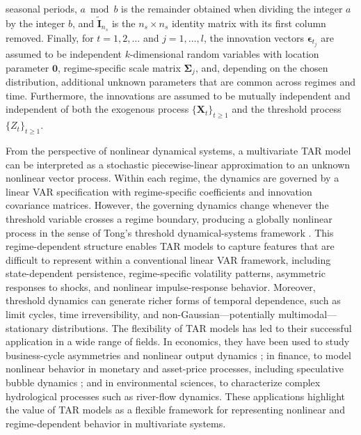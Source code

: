 seasonal periods, $a \bmod b$ is the remainder obtained when dividing the integer $a$ by the integer $b$, and $\tilde{\bm{I}}_{n_s}$ is the $n_s \times n_s$ identity matrix with its first column removed. Finally, for $t=1,2,\ldots$ and $j=1,\ldots,l$, the innovation vectors $\bm{\epsilon}_{t_j}$ are assumed to
be independent $k$-dimensional random variables with location parameter $\bm{0}$, regime-specific scale matrix $\bm{\Sigma}_j$, and, depending on the chosen distribution, additional unknown parameters that are common across regimes and time. Furthermore, the innovations are assumed to be mutually independent and independent of both the exogenous process $\{\bm{X}_t\}_{t\geq 1}$ and the threshold process $\{Z_t\}_{t\geq 1}$. 

From the perspective of nonlinear dynamical systems, a multivariate TAR model can be interpreted as a stochastic piecewise-linear approximation to an unknown nonlinear vector process. Within each regime, the dynamics are governed by a linear VAR specification with regime-specific coefficients and innovation covariance matrices. However, the governing dynamics change whenever the threshold variable crosses a regime boundary, producing a globally nonlinear process in the sense of Tong's threshold dynamical-systems framework \citep{T90}. This regime-dependent structure enables TAR models to capture features that are difficult to represent within a conventional linear VAR framework, including state-dependent persistence, regime-specific volatility patterns, asymmetric responses to shocks, and nonlinear impulse-response behavior. Moreover, threshold dynamics can generate richer forms of temporal dependence, such as limit cycles, time irreversibility, and non-Gaussian—potentially multimodal—stationary distributions. The flexibility of TAR models has led to their successful application in a wide range of fields. In economics, they have been used to study business-cycle asymmetries and nonlinear output dynamics \citep{Potter1995}; in finance, to model nonlinear behavior in monetary and asset-price processes, including speculative bubble dynamics \citep{T98,GrynkivStentoft2018}; and in environmental sciences, to characterize complex hydrological processes such as river-flow dynamics. These applications highlight the value of TAR models as a flexible framework for representing nonlinear and regime-dependent behavior in multivariate systems.

